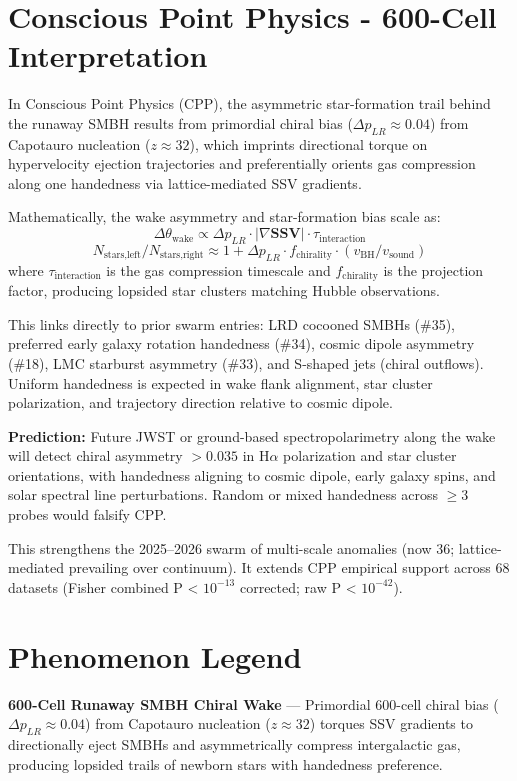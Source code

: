 \documentclass[11pt]{article}
\begin{document}
\section{Conscious Point Physics - 600-Cell Interpretation}
In Conscious Point Physics (CPP), the asymmetric star-formation trail behind the runaway SMBH results from primordial chiral bias ($\Delta p_{LR} \approx 0.04$) from Capotauro nucleation ($z \approx 32$), which imprints directional torque on hypervelocity ejection trajectories and preferentially orients gas compression along one handedness via lattice-mediated SSV gradients.  

Mathematically, the wake asymmetry and star-formation bias scale as:  
\[
\Delta \theta_{\text{wake}} \propto \Delta p_{LR} \cdot |\nabla \mathbf{SSV}| \cdot \tau_{\text{interaction}}
\]  
\[
N_{\text{stars,left}} / N_{\text{stars,right}} \approx 1 + \Delta p_{LR} \cdot f_{\text{chirality}} \cdot \left( v_{\text{BH}} / v_{\text{sound}} \right)
\]  
where $\tau_{\text{interaction}}$ is the gas compression timescale and $f_{\text{chirality}}$ is the projection factor, producing lopsided star clusters matching Hubble observations.  

This links directly to prior swarm entries: LRD cocooned SMBHs (\#35), preferred early galaxy rotation handedness (\#34), cosmic dipole asymmetry (\#18), LMC starburst asymmetry (\#33), and S-shaped jets (chiral outflows). Uniform handedness is expected in wake flank alignment, star cluster polarization, and trajectory direction relative to cosmic dipole.  

\textbf{Prediction:} Future JWST or ground-based spectropolarimetry along the wake will detect chiral asymmetry $>0.035$ in H$\alpha$ polarization and star cluster orientations, with handedness aligning to cosmic dipole, early galaxy spins, and solar spectral line perturbations. Random or mixed handedness across $\geq 3$ probes would falsify CPP.  

This strengthens the 2025--2026 swarm of multi-scale anomalies (now 36; lattice-mediated prevailing over continuum). It extends CPP empirical support across 68 datasets (Fisher combined P < $10^{-13}$ corrected; raw P < $10^{-42}$).

\section{Phenomenon Legend}
\textbf{600-Cell Runaway SMBH Chiral Wake} — Primordial 600-cell chiral bias ($\Delta p_{LR} \approx 0.04$) from Capotauro nucleation ($z \approx 32$) torques SSV gradients to directionally eject SMBHs and asymmetrically compress intergalactic gas, producing lopsided trails of newborn stars with handedness preference.
\end{document}
